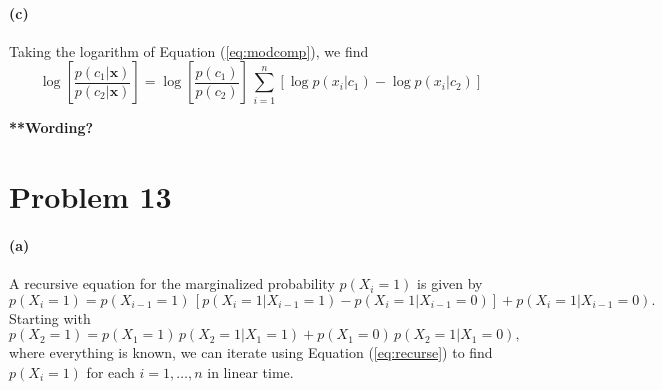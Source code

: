 \documentclass[11pt]{article}
\newcommand{\eq}[1]{Equation (\ref{eq:#1})}
\newcommand{\eqlabel}[1]{\label{eq:#1}}
\newcommand{\pr}[1]{\ensuremath{p(#1)}}
\newcommand{\bvec}[1]{\ensuremath{\boldsymbol{#1}}}
\begin{document}
\paragraph{(c)}

Taking the logarithm of \eq{modcomp}, we find
\begin{equation}
    \log \left [ \frac{\pr{c_1 | \bvec{x}}}{\pr{c_2 | \bvec{x}}} \right ]
        = \log \left [ \frac{\pr{c_1}}{\pr{c_2}} \right ] \,
            \sum_{i=1}^n
            \left [ \log \pr{x_i | c_1} - \log \pr{x_i | c_2} \right ]
\end{equation}

{\bf ***Wording?}

\section{Problem 13}

\paragraph{(a)}

A recursive equation for the marginalized probability $\pr{X_i = 1}$ is given
by
\begin{equation}\eqlabel{recurse}
    \pr{X_i=1} = \pr{X_{i-1} = 1}
        \, \left [ \pr{X_i =1 | X_{i-1} = 1}
            - \pr{X_i =1 | X_{i-1} = 0} \right ]
        + \pr{X_i =1 | X_{i-1} = 0}.
\end{equation}
Starting with
\begin{equation}
    \pr{X_2=1} = \pr{X_{1} = 1} \, \pr{X_2 =1 | X_1 = 1}
               + \pr{X_{1} = 0} \, \pr{X_2 =1 | X_1 = 0},
\end{equation}
where everything is known, we can iterate using \eq{recurse} to find
$\pr{X_i = 1}$ for each $i=1, \ldots, n$ in linear time.
\end{document}
